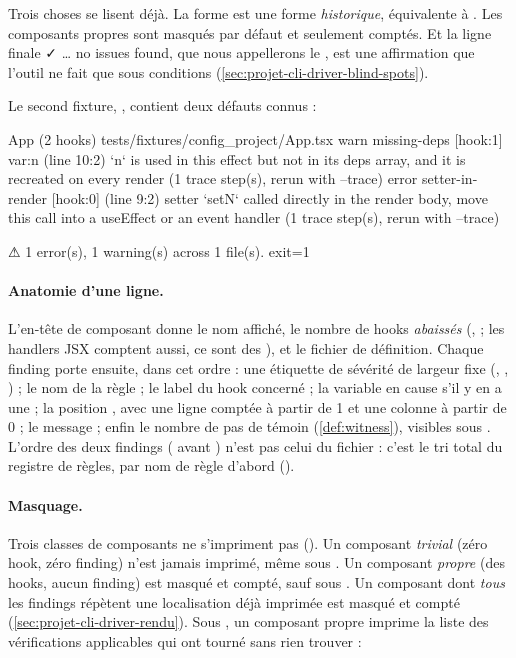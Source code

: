Trois choses se lisent déjà. La forme  est une forme \emph{historique}, équivalente à . Les composants propres sont masqués par défaut et seulement comptés. Et la ligne finale \og ✓ … no issues found\fg{}, que nous appellerons le , est une affirmation que l'outil ne fait que sous conditions (\cref{sec:projet-cli-driver-blind-spots}).

Le second fixture, , contient deux défauts connus :


\begin{sortie}
  App  (2 hooks)  tests/fixtures/config_project/App.tsx
    warn   missing-deps  [hook:1]  var:n  (line 10:2)  `n` is used in this effect but not in its deps array, and it is recreated on every render
       (1 trace step(s), rerun with --trace)
    error  setter-in-render  [hook:0]  (line 9:2)  setter `setN` called directly in the render body, move this call into a useEffect or an event handler
       (1 trace step(s), rerun with --trace)

⚠  1 error(s), 1 warning(s) across 1 file(s).
exit=1
\end{sortie}

\paragraph{Anatomie d'une ligne.} L'en-tête de composant donne le nom affiché, le nombre de hooks \emph{abaissés} (,  ; les handlers JSX comptent aussi, ce sont des ), et le fichier de définition. Chaque finding porte ensuite, dans cet ordre : une étiquette de sévérité de largeur fixe (, , ) ; le nom de la règle ; le label du hook concerné \code{[hook:N]} ; la variable en cause  s'il y en a une ; la position , avec une ligne comptée à partir de 1 et une colonne à partir de 0 ; le message ; enfin le nombre de pas de témoin (\cref{def:witness}), visibles sous . L'ordre des deux findings ( avant ) n'est pas celui du fichier : c'est le tri total du registre de règles, par nom de règle d'abord ().

\paragraph{Masquage.} Trois classes de composants ne s'impriment pas (). Un composant \emph{trivial} (zéro hook, zéro finding) n'est jamais imprimé, même sous . Un composant \emph{propre} (des hooks, aucun finding) est masqué et compté, sauf sous . Un composant dont \emph{tous} les findings répètent une localisation déjà imprimée est masqué et compté (\cref{sec:projet-cli-driver-rendu}). Sous , un composant propre imprime la liste des vérifications applicables qui ont tourné sans rien trouver :

